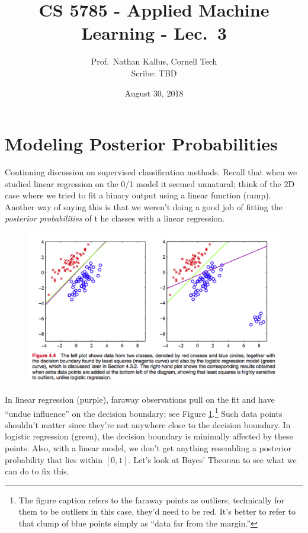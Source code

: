 \documentclass[a4paper]{article}
\title{CS 5785 - Applied Machine Learning - Lec.\ 3}
\author{Prof.\ Nathan Kallus, Cornell Tech\\Scribe: TBD}
\date{August 30, 2018}
\begin{document}
\maketitle


\section{Modeling Posterior Probabilities}
Continuing discussion on supervised classification methods.  Recall that when we studied linear regression on the 0/1 model it seemed unnatural; think of the 2D case where we tried to fit a binary output using a linear function (ramp).  Another way of saying this is that we weren't doing a good job of fitting the \emph{posterior probabilities} of t he classes with a linear regression.

\begin{figure}
\centering
\includegraphics[width=1.0\textwidth]{bishop_fig4_4.png}
\label{fig:faraway}
\end{figure}

In linear regression ({\color{purple}purple}), faraway observations pull on the fit and have ``undue influence'' on the decision boundary; see Figure \ref{fig:faraway}.\footnote{The figure caption refers to the faraway points as outliers; technically for them to be outliers in this case, they'd need to be red. It's better to refer to that clump of blue points simply as ``data far from the margin.''} Such data points  shouldn't matter since they're not anywhere close to the decision boundary. In logistic regression ({\color{green}green}), the decision boundary is minimally affected by these points. Also, with a linear model, we don't get anything resembling a posterior probability that lies within $[0,1]$. Let's look at Bayes' Theorem to see what we can do to fix this. 
\end{document}
